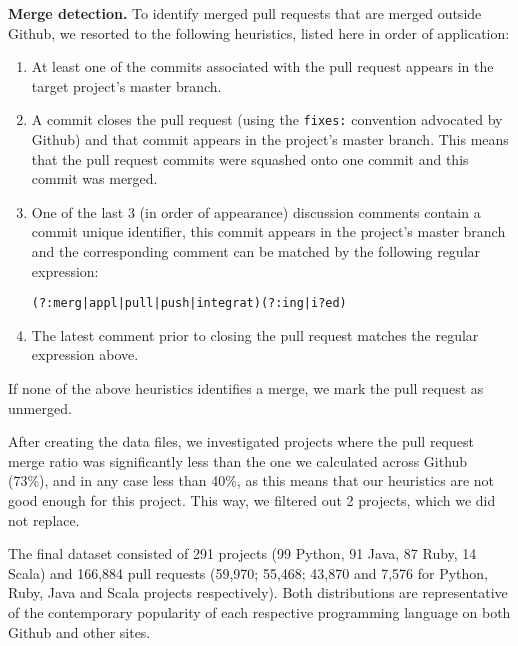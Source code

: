 \documentclass{sig-alternate}
\begin{document}
\textbf{Merge detection.} To
identify merged pull requests that are merged outside Github, we resorted to the following heuristics, listed here in order of application:

\begin{enumerate}

  \item At least one of the commits associated with the pull request appears in
    the target project's master branch. 

  \item A commit closes the pull request (using the \texttt{fixes:} convention
    advocated by Github) and that commit appears in the project's master branch.
    This means that the pull request commits were squashed onto one commit and
    this commit was merged.

  \item One of the last 3 (in order of appearance) discussion comments contain a
    commit unique identifier, this commit appears in the project's master branch
    and the corresponding comment can be matched by the following regular
    expression:

    \begin{small}
    \texttt{(?:merg|appl|pull|push|integrat)(?:ing|i?ed)}
    \end{small}
  \item The latest comment prior to closing the pull request matches the 
    regular expression above.

\end{enumerate}

If none of the above heuristics identifies a merge, we mark the pull request
as unmerged. 

After creating the data files, we investigated projects where the pull request
merge ratio was significantly less than the one we calculated across Github
(73\%), and in any case less than 40\%, as this means that our heuristics are not
good enough for this project. This way, we filtered out 2 projects, which we did not
replace.

The final dataset consisted of 291 projects (99 Python, 91 Java, 87 Ruby, 14
Scala) and 166,884 pull requests (59,970; 55,468; 43,870 and 7,576 for Python,
Ruby, Java and Scala projects respectively). Both distributions are
representative of the contemporary popularity of each respective programming
language on both Github and other sites.

%
\end{document}
